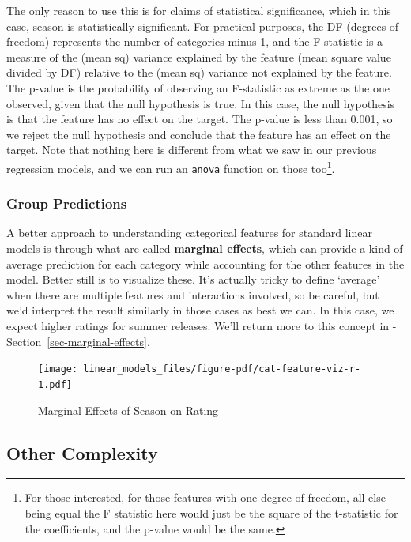 \documentclass[
  letterpaper,
]{krantz}
\begin{document}
The only reason to use this is for claims of statistical significance,
which in this case, season is statistically significant. For practical
purposes, the DF (degrees of freedom) represents the number of
categories minus 1, and the F-statistic is a measure of the (mean sq)
variance explained by the feature (mean square value divided by DF)
relative to the (mean sq) variance not explained by the feature. The
p-value is the probability of observing an F-statistic as extreme as the
one observed, given that the null hypothesis is true. In this case, the
null hypothesis is that the feature has no effect on the target. The
p-value is less than 0.001, so we reject the null hypothesis and
conclude that the feature has an effect on the target. Note that nothing
here is different from what we saw in our previous regression models,
and we can run an \texttt{anova} function on those too\footnote{For
  those interested, for those features with one degree of freedom, all
  else being equal the F statistic here would just be the square of the
  t-statistic for the coefficients, and the p-value would be the same.}.

\subsubsection{Group Predictions}\label{group-predictions}

A better approach to understanding categorical features for standard
linear models is through what are called \textbf{marginal effects},
which can provide a kind of average prediction for each category while
accounting for the other features in the model. Better still is to
visualize these. It's actually tricky to define `average' when there are
multiple features and interactions involved, so be careful, but we'd
interpret the result similarly in those cases as best we can. In this
case, we expect higher ratings for summer releases. We'll return more to
this concept in -Section~\ref{sec-marginal-effects}.

\begin{figure}[H]

{\centering \texttt{[image: linear\_models\_files/figure-pdf/cat-feature-viz-r-1.pdf]}

}

\caption{Marginal Effects of Season on Rating}

\end{figure}%

\subsection{Other Complexity}\label{sec-lm-other-complexity}
\end{document}
